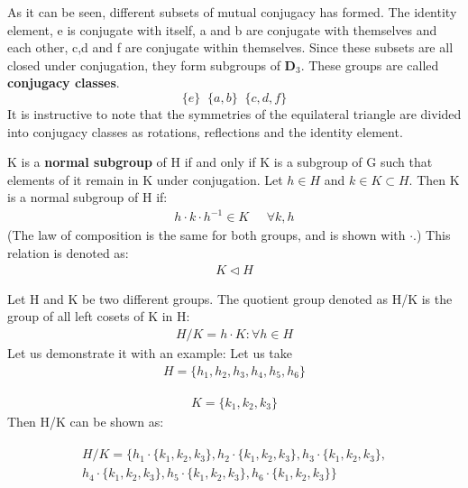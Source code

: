 \begin{example}
As it can be seen, different subsets of mutual conjugacy has formed. The identity element, e is conjugate with itself, a and b are conjugate with themselves and each other, c,d and f are conjugate within themselves. Since these subsets are all closed under conjugation, they form subgroups of $\mathbf{D}_3$. These groups are called \textbf{conjugacy classes}. \label{Conjugacy Class}
\[ \{ e \} \;\; \{a , b \} \;\; \{ c,d,f \} \] It is instructive to note that the symmetries of the equilateral triangle are divided into conjugacy classes as rotations, reflections and the identity element. 
\end{example}
%
\begin{definition}
K is a \textbf{normal subgroup} of H if and only if K is a subgroup of G such that elements of it remain in K under conjugation.
\cite{armstrong_groups_1988}
Let $h \in H$ and $k \in K \subset H$. Then K is a normal subgroup of H if:
\begin{align}
h\cdot k \cdot h^{-1} \in K \;\;\;\;\; \forall k,h
\end{align}
%
(The law of composition is the same for both groups, and is shown with $\cdot$.) This relation is denoted as:
%
\begin{align}
K \triangleleft H
\end{align}
\end{definition}
%
\begin{definition}
Let H and K be two different groups. The quotient group denoted as H/K is the group of all left cosets of K in H:
\cite{rosen_symmetry_1995,armstrong_groups_1988}
\begin{align}
H/K = {h\cdot K : \forall h \in H}
\end{align}
Let us demonstrate it with an example:
Let us take 
\begin{align}H=\{h_1,h_2,h_3,h_4,h_5,h_6\} \end{align}

\begin{align}K=\{k_1,k_2,k_3\}\end{align}
Then H/K can be shown as:

\begin{align}
\begin{array}{c}
H/K=\{h_1\cdot \{k_1,k_2,k_3\},h_2 \cdot \{k_1,k_2,k_3\},h_3\cdot \{k_1,k_2,k_3\},\\
h_4\cdot \{k_1,k_2,k_3\},h_5 \cdot \{k_1,k_2,k_3\},h_6\cdot \{k_1,k_2,k_3\}\}
\end{array}
\end{align}

\end{definition}
